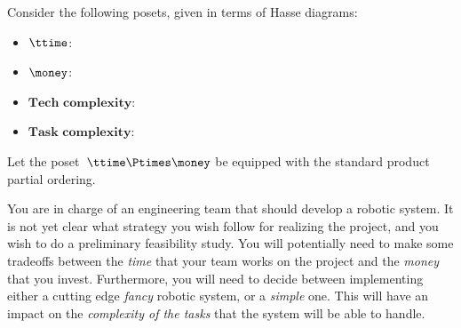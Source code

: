 \begin{gradedexercise}
    \label{ex:DPComposition}

    Consider the following posets, given in terms of Hasse diagrams:
    \begin{itemize}
        \item $\ttime$:
        \begin{center}
        \end{center}

        \item $\money$:
        \begin{center}
        \end{center}

        \item $\textbf{Tech complexity}$:
        \begin{center}
        \end{center}

        \item $\textbf{Task complexity}$:
        \begin{center}
        \end{center}
    \end{itemize}
    Let the poset~$\ttime \Ptimes \money$ be equipped with the standard product partial ordering.

    You are in charge of an engineering team that should develop a robotic system.
    It is not yet clear what strategy you wish follow for realizing the project, and you wish to do a preliminary feasibility study.
    You will potentially need to make some tradeoffs between the \emph{time} that your team works on the project and the \emph{money} that you invest.
    Furthermore, you will need to decide between implementing either a cutting edge \emph{fancy} robotic system, or a \emph{simple} one.
    This will have an impact on the \emph{complexity of the tasks} that the system will be able to handle.


\end{gradedexercise}
